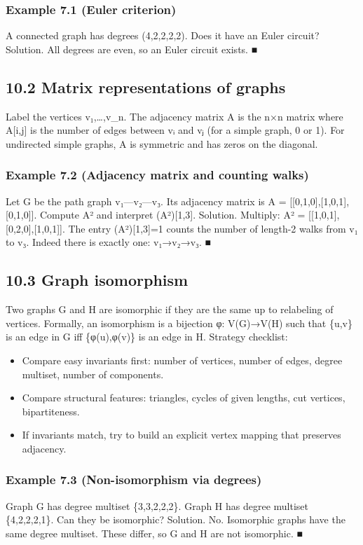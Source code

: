 \documentclass[11pt]{article}
\begin{document}
\subsubsection*{Example 7.1 (Euler criterion)}
A connected graph has degrees (4,2,2,2,2). Does it have an Euler circuit?
Solution. All degrees are even, so an Euler circuit exists. ■
\subsection{10.2 Matrix representations of graphs}
Label the vertices v₁,…,v\_n. The adjacency matrix A is the n×n matrix where A[i,j] is the
number of edges between vᵢ and vⱼ (for a simple graph, 0 or 1). For undirected simple
graphs, A is symmetric and has zeros on the diagonal.

\subsubsection*{Example 7.2 (Adjacency matrix and counting walks)}
Let G be the path graph v₁—v₂—v₃. Its adjacency matrix is
A = [[0,1,0],[1,0,1],[0,1,0]].
Compute A² and interpret (A²)[1,3].
Solution. Multiply:
A² = [[1,0,1],[0,2,0],[1,0,1]].
The entry (A²)[1,3]=1 counts the number of length-2 walks from v₁ to v₃. Indeed
there is exactly one: v₁→v₂→v₃. ■
\subsection{10.3 Graph isomorphism}
Two graphs G and H are isomorphic if they are the same up to relabeling of vertices.
Formally, an isomorphism is a bijection φ: V(G)→V(H) such that \{u,v\} is an edge in G iff
\{φ(u),φ(v)\} is an edge in H.
Strategy checklist:
\begin{itemize}[leftmargin=*,itemsep=0.25em]
\item Compare easy invariants first: number of vertices, number of edges, degree multiset, number of components.
\item Compare structural features: triangles, cycles of given lengths, cut vertices, bipartiteness.
\item If invariants match, try to build an explicit vertex mapping that preserves adjacency.
\end{itemize}
\subsubsection*{Example 7.3 (Non-isomorphism via degrees)}
Graph G has degree multiset \{3,3,2,2,2\}. Graph H has degree multiset
\{4,2,2,2,1\}. Can they be isomorphic?
Solution. No. Isomorphic graphs have the same degree multiset. These differ, so G
and H are not isomorphic. ■
\end{document}
